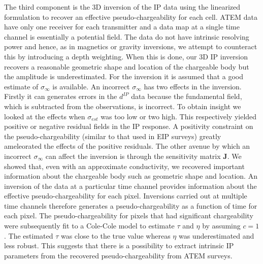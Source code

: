 \documentclass[extra,mreferee]{gji}
\newcommand{\siginf}{\sigma_\infty}
\begin{document}
The third component is the 3D inversion of the IP data using the linearized formulation to recover an effective pseudo-chargeability for each cell. ATEM data have only one receiver for each transmitter and a data map at a single time channel is essentially a potential field. The data do not have intrinsic resolving power and hence, as in magnetics or gravity inversions, we attempt to counteract this by introducing a depth weighting.  When this is done, our 3D IP inversion recovers a reasonable geometric shape and location of the chargeable body but the amplitude is underestimated. For the inversion it is assumed that a good estimate of $\siginf$ is available. An incorrect $\siginf$ has two effects in the inversion. Firstly it can generates errors in the $d^{IP}$ data because the fundamental field, which is subtracted from the observations, is incorrect. To obtain insight we looked at the effects when $\sigma_{est}$ was too low or two high. This respectively yielded positive or negative residual fields in the IP response. A positivity constraint on the pseudo-chargeability (similar to that used in EIP surveys) greatly ameleorated the effects of the positive residuals. The other avenue by which an incorrect $\siginf$ can affect the inversion is through the sensitivity matrix $\mathbf{J}$. We showed that, even with an approximate conductivity, we recovered important information about the chargeable body such as geometric shape and location. An inversion of the data at a particular time channel provides information about the effective pseudo-chargeability for each pixel. Inversions carried out at multiple time channels therefore generates a pseudo-chargeability as a function of time for each pixel. The pseudo-chargeability for pixels that had significant chargeability were subsequently fit to a Cole-Cole model to estimate $\tau$ and $\eta$ by assuming $c=1$. The estimated $\tau$ was close to the true value whereas $\eta$ was underestimated and less robust. This suggests that there is a possibility to extract intrinsic IP parameters from the recovered pseudo-chargeability from ATEM surveys.
\end{document}
